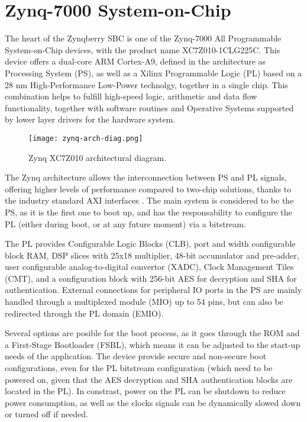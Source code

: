 \section{Zynq-7000 System-on-Chip}

The heart of the Zynqberry SBC is one of the Zynq-7000 All Programmable System-on-Chip devices, with the product name XC7Z010-1CLG225C. This device offers a dual-core ARM Cortex-A9, defined in the architecture as Processing System (PS), as well as a Xilinx Programmable Logic (PL) based on a 28 nm High-Performance Low-Power technolgy, together in a single chip. This combination helps to fulfill high-speed logic, arithmetic and data flow functionality, together with software routines and Operative Systems supported by lower layer drivers for the hardware system.

\begin{figure}[htp]
	\centering
	\texttt{[image: zynq-arch-diag.png]}
	\caption{Zynq XC7Z010 architectural diagram.} \label{fig:zynq-arch-diag}
\end{figure}

The Zynq architecture allows the interconnection between PS  and PL signals, offering higher levels of performance compared to two-chip solutions, thanks to the industry standard AXI interfaces \cite{Crokett2014}. The main system is considered to be the PS, as it is the first one to boot up, and has the responsability to configure the PL (either during boot, or at any future moment) via a bitstream.

The PL provides Configurable Logic Blocks (CLB), port and width configurable block RAM, DSP slices with 25x18 multiplier, 48-bit accumulator and pre-adder, user configurable analog-to-digital convertor (XADC), Clock Management Tiles (CMT), and a configuration block with 256-bit AES for decryption and SHA for authentication. External connections for peripheral IO ports in the PS are mainly handled through a multiplexed module (MIO) up to 54 pins, but can also be redirected through the PL domain (EMIO).

Several options are posible for the boot process, as it goes through the ROM and a First-Stage Bootloader (FSBL), which means it can be adjusted to the start-up needs of the application. The device provide secure and non-secure boot configurations, even for the PL bitstream configuration (which need to be powered on, given that the AES decryption and SHA authentication blocks are located in the PL). In constrast, power on the PL can be shutdown to reduce power consumption, as well as the clocks signals can be dynamically slowed down or turned off if needed.

